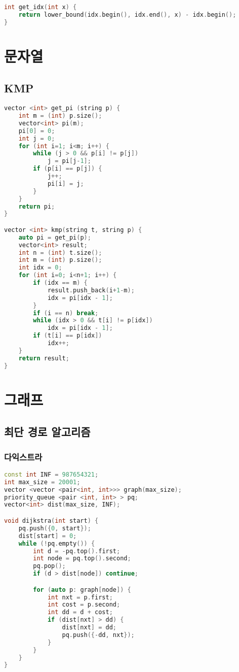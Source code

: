 \documentclass[]{article}
\begin{document}
\begin{multicols*}{2}
\begin{lstlisting}[language=c++]
int get_idx(int x) {
    return lower_bound(idx.begin(), idx.end(), x) - idx.begin();
}
\end{lstlisting}
\section{문자열}
\subsection{KMP}
\begin{lstlisting}[language=c++]
vector <int> get_pi (string p) {
    int m = (int) p.size();
    vector<int> pi(m);
    pi[0] = 0;
    int j = 0;
    for (int i=1; i<m; i++) {
        while (j > 0 && p[i] != p[j])
            j = pi[j-1];
        if (p[i] == p[j]) {
            j++;
            pi[i] = j;
        }
    }
    return pi;
}

vector <int> kmp(string t, string p) {
    auto pi = get_pi(p);
    vector<int> result;
    int n = (int) t.size();
    int m = (int) p.size();
    int idx = 0;
    for (int i=0; i<n+1; i++) {
        if (idx == m) {
            result.push_back(i+1-m);
            idx = pi[idx - 1];
        }
        if (i == n) break;
        while (idx > 0 && t[i] != p[idx])
            idx = pi[idx - 1];
        if (t[i] == p[idx])
            idx++;
    }
    return result;
}
\end{lstlisting}
\section{그래프}
\subsection{최단 경로 알고리즘}
\subsubsection{다익스트라}
\begin{lstlisting}[language=c++]
const int INF = 987654321;
int max_size = 20001;
vector <vector <pair<int, int>>> graph(max_size);
priority_queue <pair <int, int> > pq;
vector<int> dist(max_size, INF);

void dijkstra(int start) {
    pq.push({0, start});
    dist[start] = 0;
    while (!pq.empty()) {
        int d = -pq.top().first;
        int node = pq.top().second;
        pq.pop();
        if (d > dist[node]) continue;

        for (auto p: graph[node]) {
            int nxt = p.first;
            int cost = p.second;
            int dd = d + cost;
            if (dist[nxt] > dd) {
                dist[nxt] = dd;
                pq.push({-dd, nxt});
            }
        }
    }
}
\end{lstlisting}

\end{multicols*}
\end{document}
